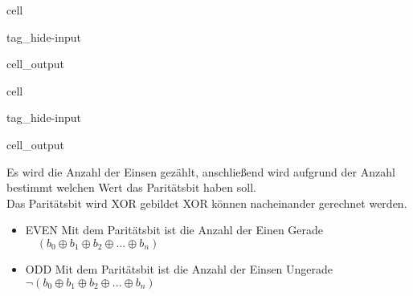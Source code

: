 \documentclass[letterpaper,10pt,english]{jupyterBook}
\begin{document}
\begin{sphinxuseclass}{cell}
\begin{sphinxuseclass}{tag_hide-input}\begin{sphinxVerbatimOutput}

\begin{sphinxuseclass}{cell_output}
\noindent{}

\end{sphinxuseclass}\end{sphinxVerbatimOutput}

\end{sphinxuseclass}
\end{sphinxuseclass}
\begin{sphinxuseclass}{cell}
\begin{sphinxuseclass}{tag_hide-input}\begin{sphinxVerbatimOutput}

\begin{sphinxuseclass}{cell_output}
\noindent{}

\noindent{}

\noindent{}

\end{sphinxuseclass}\end{sphinxVerbatimOutput}

\end{sphinxuseclass}
\end{sphinxuseclass}
\begin{DUlineblock}{0em}
\item[] 
\end{DUlineblock}

\begin{DUlineblock}{0em}
\item[] 
\end{DUlineblock}

\sphinxAtStartPar
Es wird die Anzahl der Einsen gezählt,
anschließend wird aufgrund der Anzahl bestimmt welchen Wert das Paritätsbit haben soll.\\
Das Paritätsbit wird XOR gebildet
XOR können nacheinander gerechnet werden.
\begin{itemize}
\item {} 
\sphinxAtStartPar
EVEN
Mit dem Paritätsbit ist die Anzahl der Einen Gerade\\
\(\quad\left(b_0 \oplus b_1 \oplus b_2 \oplus ...\oplus b_n\right)\)

\item {} 
\sphinxAtStartPar
ODD
Mit dem Paritätsbit ist die Anzahl der Einsen Ungerade\\
\(\neg\left(b_0 \oplus b_1 \oplus b_2 \oplus ...\oplus b_n\right)\)

\end{itemize}
\end{document}
